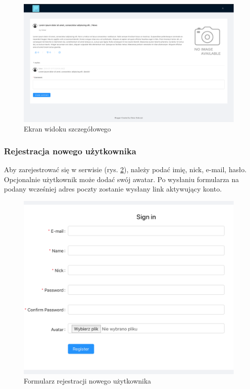 \documentclass[declaration,shortabstract,polish,inz]{iithesis}
\begin{document}
\begin{figure}[H]
    \centering
    \includegraphics[width=\textwidth]{images/widok_postu.png}
    \caption{Ekran widoku szczegółowego}
    \label{fig:post_view}
\end{figure}

\subsubsection{Rejestracja nowego użytkownika}
Aby zarejestrować się w serwisie (rys. \ref{fig:register}), należy podać imię, nick, e-mail, hasło. Opcjonalnie użytkownik może dodać swój awatar. Po wysłaniu formularza na podany wcześniej adres poczty zostanie wysłany link aktywujący konto.

\begin{figure}[H]
    \centering
    \includegraphics[width=\textwidth]{images/rejestracja.png}
    \caption{Formularz rejestracji nowego użytkownika}
    \label{fig:register}
\end{figure}
\end{document}
